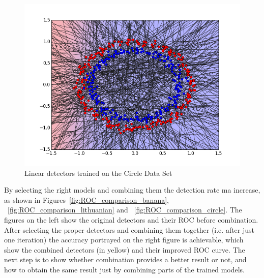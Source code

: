 \begin{figure}[H]
\centering
\includegraphics[scale=0.6]{figs/AllClassifiersCircle}
\caption{Linear detectors trained on the Circle Data Set}
\label{Figure::circle_all}
\end{figure}

By selecting the right models and combining them the detection rate ma increase, as shown in Figures~\ref{fig:ROC_comparison_banana}, ~\ref{fig:ROC_comparison_lithuanian} and ~\ref{fig:ROC_comparison_circle}. The figures on the left show the original detectors and their ROC before combination. After selecting the proper detectors and combining them together (i.e. after just one iteration) the accuracy portrayed on the right figure is achievable, which show the combined detectors (in yellow) and their improved ROC curve. The next step is to show whether combination provides a better result or not, and how to obtain the same result just by combining parts of the trained models.



